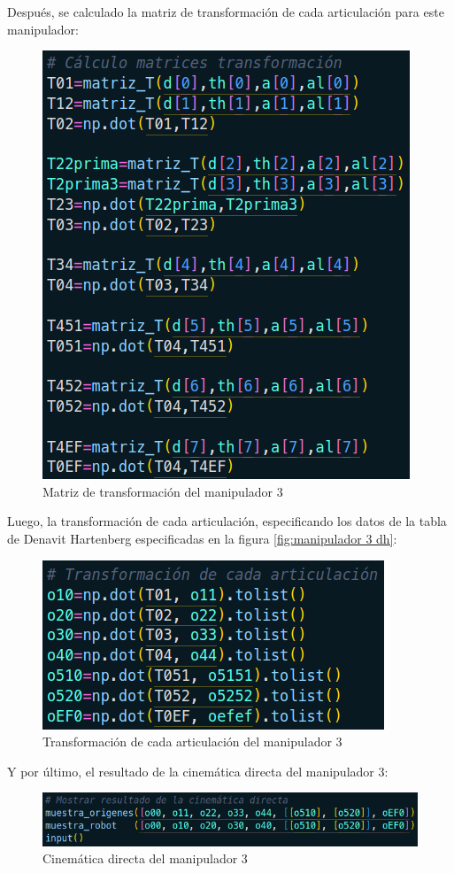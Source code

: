 \documentclass[11pt]{report}
\begin{document}
\newpage

Después, se calculado la matriz de transformación de cada articulación para este manipulador:
\begin{figure}[H]
  \centering
  \includegraphics[scale=0.5]{img/matriz_transformacion.png}
  \caption{Matriz de transformación del manipulador 3}
  \label{fig:manipulador 3 matriz transformacion}
\end{figure}

Luego, la transformación de cada articulación, especificando los datos de la tabla de Denavit Hartenberg especificadas en la figura \ref{fig:manipulador 3 dh}:
\begin{figure}[H]
  \centering
  \includegraphics[scale=0.5]{img/transformacion_articulacion.png}
  \caption{Transformación de cada articulación del manipulador 3}
  \label{fig:manipulador 3 transformacion articulacion}
\end{figure}

Y por último, el resultado de la cinemática directa del manipulador 3:
\begin{figure}[H]
  \centering
  \includegraphics[scale=0.5]{img/resultado_cd.png}
  \caption{Cinemática directa del manipulador 3}
\end{figure}
\end{document}
